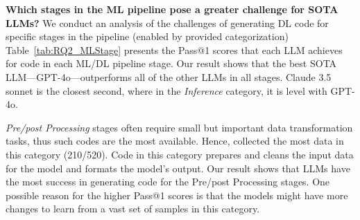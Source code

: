 


\textbf{Which stages in the ML pipeline pose a greater challenge for SOTA LLMs?}
We conduct an analysis of the challenges of generating DL code for specific stages in the pipeline (enabled by %
\tool provided categorization)
Table~\ref{tab:RQ2_MLStage} presents the Pass@1 scores that each LLM achieves for code in each %
ML/DL pipeline stage.
Our result shows that the best SOTA LLM---GPT-4o---outperforms all of the other LLMs in all stages. Claude 3.5 sonnet is the closest second, where in the \textit{Inference} category, it is level with GPT-4o. 


%
\textit{Pre/post Processing} stages often require small but important data transformation tasks, thus such codes are the most available. Hence, 
\tool collected the most data in this category (210/520). %
Code in this category prepares and cleans the input data for the model and formats the model's output. 
Our result shows that LLMs have the most success in generating code for 
the Pre/post Processing stages. 
One possible reason for the higher Pass@1 scores is that the models might have more changes to learn from a vast set of samples in this category. 

